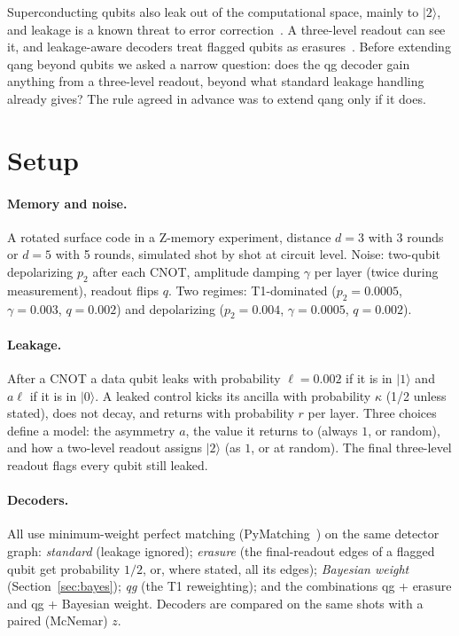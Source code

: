 \documentclass[11pt]{article}
\begin{document}
Superconducting qubits also leak out of the computational space, mainly to $|2\rangle$, and leakage is
a known threat to error correction~\cite{aliferis2007leakage,suchara2015leakage,mcewen2021leakage}. A
three-level readout can see it, and leakage-aware decoders treat flagged qubits as
erasures~\cite{suchara2015leakage,wu2022erasure,varbanov2020leakage}. Before extending qang beyond
qubits we asked a narrow question: does the qg decoder gain anything from a three-level readout,
beyond what standard leakage handling already gives? The rule agreed in advance was to extend qang
only if it does.

\section{Setup}

\paragraph{Memory and noise.} A rotated surface code in a Z-memory experiment, distance $d=3$ with 3
rounds or $d=5$ with 5 rounds, simulated shot by shot at circuit level. Noise: two-qubit depolarizing
$p_2$ after each CNOT, amplitude damping $\gamma$ per layer (twice during measurement), readout flips
$q$. Two regimes: T1-dominated ($p_2=0.0005$, $\gamma=0.003$, $q=0.002$) and depolarizing
($p_2=0.004$, $\gamma=0.0005$, $q=0.002$).

\paragraph{Leakage.} After a CNOT a data qubit leaks with probability $\ell=0.002$ if it is in
$|1\rangle$ and $a\ell$ if it is in $|0\rangle$. A leaked control kicks its ancilla with probability
$\kappa$ (1/2 unless stated), does not decay, and returns with probability $r$ per layer. Three
choices define a model: the asymmetry $a$, the value it returns to (always $1$, or random), and how a
two-level readout assigns $|2\rangle$ (as $1$, or at random). The final three-level readout flags every
qubit still leaked.

\paragraph{Decoders.} All use minimum-weight perfect matching (PyMatching~\cite{higgott2022pymatching})
on the same detector graph: \emph{standard} (leakage ignored); \emph{erasure} (the final-readout edges
of a flagged qubit get probability $1/2$, or, where stated, all its edges); \emph{Bayesian weight}
(Section~\ref{sec:bayes}); \emph{qg} (the T1 reweighting); and the combinations qg + erasure and
qg + Bayesian weight. Decoders are compared on the same shots with a paired (McNemar) $z$.
\end{document}
